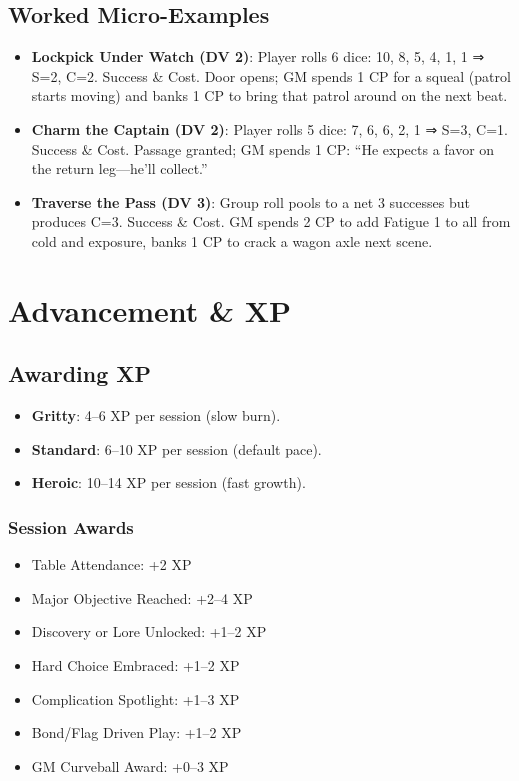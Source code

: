 \documentclass[11pt]{article}
\begin{document}
\subsection{Worked Micro-Examples}
\begin{itemize}
    \item \textbf{Lockpick Under Watch (DV 2)}: Player rolls 6 dice: 10, 8, 5, 4, 1, 1 ⇒ S=2, C=2. Success \& Cost. Door opens; GM spends 1 CP for a squeal (patrol starts moving) and banks 1 CP to bring that patrol around on the next beat.
    \item \textbf{Charm the Captain (DV 2)}: Player rolls 5 dice: 7, 6, 6, 2, 1 ⇒ S=3, C=1. Success \& Cost. Passage granted; GM spends 1 CP: “He expects a favor on the return leg—he’ll collect.”
    \item \textbf{Traverse the Pass (DV 3)}: Group roll pools to a net 3 successes but produces C=3. Success \& Cost. GM spends 2 CP to add Fatigue 1 to all from cold and exposure, banks 1 CP to crack a wagon axle next scene.
\end{itemize}

\section{Advancement \& XP}

\subsection{Awarding XP}
\begin{itemize}
    \item \textbf{Gritty}: 4–6 XP per session (slow burn).
    \item \textbf{Standard}: 6–10 XP per session (default pace).
    \item \textbf{Heroic}: 10–14 XP per session (fast growth).
\end{itemize}

\subsubsection{Session Awards}
\begin{itemize}
    \item Table Attendance: +2 XP
    \item Major Objective Reached: +2–4 XP
    \item Discovery or Lore Unlocked: +1–2 XP
    \item Hard Choice Embraced: +1–2 XP
    \item Complication Spotlight: +1–3 XP
    \item Bond/Flag Driven Play: +1–2 XP
    \item GM Curveball Award: +0–3 XP
\end{itemize}
\end{document}

